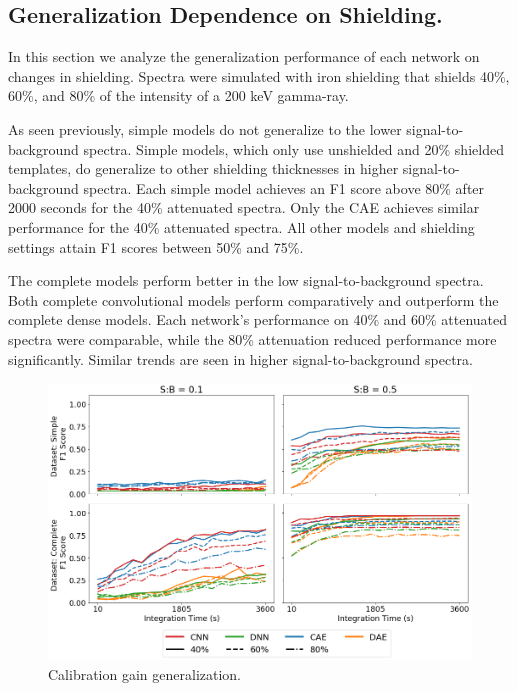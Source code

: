\subsection{Generalization Dependence on Shielding.}

In this section we analyze the generalization performance of each network on changes in shielding. Spectra were simulated with iron shielding that shields 40\%, 60\%, and 80\% of the intensity of a 200 keV gamma-ray.

As seen previously, simple models do not generalize to the lower signal-to-background spectra. Simple models, which only use unshielded and 20\% shielded templates, do generalize to other shielding thicknesses in higher signal-to-background spectra. Each simple model achieves an F1 score above 80\% after 2000 seconds for the 40\% attenuated spectra. Only the CAE achieves similar performance for the 40\% attenuated spectra. All other models and shielding settings attain F1 scores between 50\% and 75\%.

The complete models perform better in the low signal-to-background spectra. Both complete convolutional models perform comparatively and outperform the complete dense models. Each network's performance on 40\% and 60\% attenuated spectra were comparable, while the 80\% attenuation reduced performance more significantly. Similar trends are seen in higher signal-to-background spectra. 

\begin{figure}[H]
	\centering
	\includegraphics[width=1.0\linewidth]{images/sim-generalization-ironshield}
	\caption{Calibration gain generalization.}
	\label{fig:sim-generalization-ironshield}
\end{figure}

